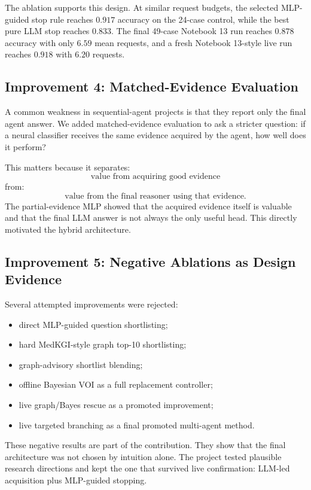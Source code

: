 \documentclass[11pt]{article}
\begin{document}
The ablation supports this design. At similar request budgets, the selected MLP-guided stop rule reaches $0.917$ accuracy on the 24-case control, while the best pure LLM stop reaches $0.833$. The final 49-case Notebook 13 run reaches $0.878$ accuracy with only $6.59$ mean requests, and a fresh Notebook 13-style live run reaches $0.918$ with $6.20$ requests.

\subsection{Improvement 4: Matched-Evidence Evaluation}

A common weakness in sequential-agent projects is that they report only the final agent answer. We added matched-evidence evaluation to ask a stricter question: if a neural classifier receives the same evidence acquired by the agent, how well does it perform?

This matters because it separates:
\[
\text{value from acquiring good evidence}
\]
from:
\[
\text{value from the final reasoner using that evidence.}
\]
The partial-evidence MLP showed that the acquired evidence itself is valuable and that the final LLM answer is not always the only useful head. This directly motivated the hybrid architecture.

\subsection{Improvement 5: Negative Ablations as Design Evidence}

Several attempted improvements were rejected:
\begin{itemize}[leftmargin=*]
    \item direct MLP-guided question shortlisting;
    \item hard MedKGI-style graph top-10 shortlisting;
    \item graph-advisory shortlist blending;
    \item offline Bayesian VOI as a full replacement controller;
    \item live graph/Bayes rescue as a promoted improvement;
    \item live targeted branching as a final promoted multi-agent method.
\end{itemize}

These negative results are part of the contribution. They show that the final architecture was not chosen by intuition alone. The project tested plausible research directions and kept the one that survived live confirmation: LLM-led acquisition plus MLP-guided stopping.
\end{document}
